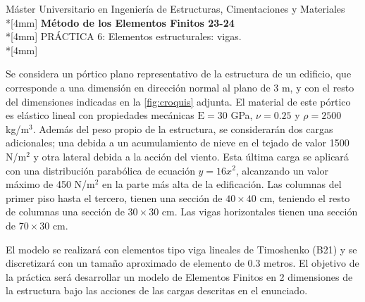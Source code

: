 \documentclass[a4paper,12pt]{article}
\begin{document}
\def\bm#1{{\mbox{\boldmath $#1$}}}
\def\eqdef{\buildrel \rm def \over =}
\def\signo{\mathop{\rm signo}\nolimits}

\mbox{}\vspace*{-20mm}


{\centering
{\small\sc %
Máster Universitario en Ingeniería de Estructuras, Cimentaciones y Materiales}\\*[4mm]
{\Large\bf Método de los Elementos Finitos 23-24}\\*[4mm]
PRÁCTICA 6: Elementos estructurales: vigas. \\*[4mm]}


\noindent
Se considera un pórtico plano representativo de la estructura de un edificio, que corresponde a una dimensión en dirección normal al plano de 3 m, y con el resto del dimensiones indicadas en la \cref{fig:croquis} adjunta. El material de este pórtico es elástico lineal con propiedades mecánicas $\text{E}=30$ GPa, $\nu=0.25$ y $\rho=2500$ kg/m$^3$. Además del peso propio de la estructura, se considerarán dos cargas adicionales; una debida a un acumulamiento de nieve en el tejado de valor 1500 N/m$^2$ y otra lateral debida a la acción del viento. Esta última carga se aplicará con una distribución parabólica de ecuación $y=16x^2$, alcanzando un valor máximo de 450 N/m$^2$ en la parte más alta de la edificación.
Las columnas del primer piso hasta el tercero, tienen una sección de $40 \times 40$ cm, teniendo el resto de columnas una sección de $30 \times 30$ cm. Las vigas horizontales tienen una sección de $70 \times 30$ cm.

El modelo se realizará con elementos tipo viga lineales de Timoshenko (B21) y se discretizará con un tamaño aproximado de elemento de 0.3 metros. El objetivo de la práctica será desarrollar un modelo de Elementos Finitos en 2 dimensiones de la estructura bajo las acciones de las cargas descritas en el enunciado.
\end{document}
